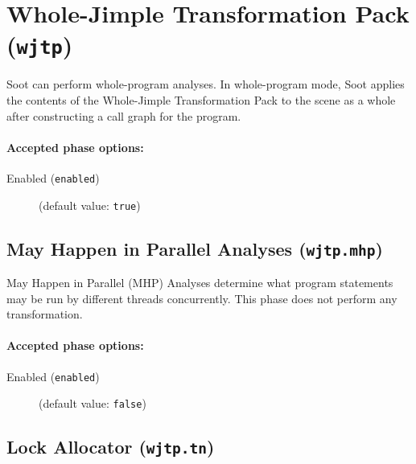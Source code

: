 \documentclass{article}
\begin{document}
\section{Whole-Jimple Transformation Pack ({\tt wjtp})}


\par

Soot can perform whole-program analyses.  In whole-program mode,
Soot applies the contents of the Whole-Jimple Transformation Pack
to the scene as a whole after constructing a call graph for the
program.
                        

\paragraph{Accepted phase options:} 

\begin{description}

\item[Enabled ({\tt enabled})]
(default value: {\tt true})






\end{description}

\subsection{May Happen in Parallel Analyses ({\tt wjtp.mhp})}

May Happen in Parallel (MHP) Analyses determine what program statements may
be run by different threads concurrently.  This phase does not perform any
transformation.


\paragraph{Accepted phase options:} 

\begin{description}

\item[Enabled ({\tt enabled})]
(default value: {\tt false})






\end{description}

\subsection{Lock Allocator ({\tt wjtp.tn})}
\end{document}
